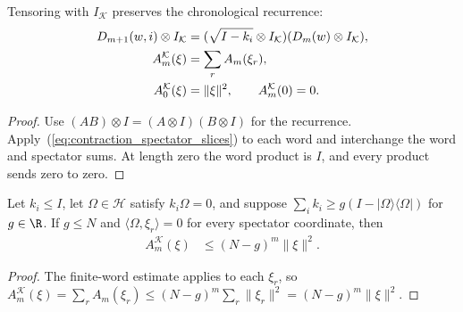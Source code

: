 \begin{theorem}
    \label{thm:contraction_spectator_sum}
    \leanok
    Tensoring with $I_{\mathcal K}$ preserves the chronological recurrence:
    \begin{align}
        D_{m+1}(w,i)\otimes I_{\mathcal K}
         & =(\sqrt{I-k_i}\otimes I_{\mathcal K})(D_m(w)\otimes I_{\mathcal K}),
        \label{eq:contraction_spectator_word_sum}\\
        A_m^{\mathcal K}(\xi)&=\sum_r A_m(\xi_r),\notag\\
        A_0^{\mathcal K}(\xi)&=\|\xi\|^2,\qquad A_m^{\mathcal K}(0)=0.\notag
    \end{align}
\end{theorem}
\begin{proof}
    \leanok
    Use $(AB)\otimes I=(A\otimes I)(B\otimes I)$ for the recurrence.
    Apply~(\ref{eq:contraction_spectator_slices}) to each word and
    interchange the word and spectator sums. At length zero the word
    product is $I$, and every product sends zero to zero.
\end{proof}

\begin{theorem}
    \label{thm:contraction_spectator_decay}
    \leanok
    Let $k_i\le I$, let $\Omega\in\mathcal H$ satisfy $k_i\Omega=0$,
    and suppose
    $\sum_i k_i\ge g(I-|\Omega\rangle\langle\Omega|)$ for $g\in\R$.
    If $g\le N$ and
    $\langle\Omega,\xi_r\rangle=0$ for every spectator coordinate, then
    \begin{align}
        A_m^{\mathcal K}(\xi)&\le(N-g)^m\|\xi\|^2.
        \label{eq:contraction_spectator_decay}
    \end{align}
\end{theorem}
\begin{proof}
    \leanok
    The finite-word estimate applies to each $\xi_r$, so
    $A_m^{\mathcal K}(\xi)=\sum_r A_m(\xi_r)
    \le(N-g)^m\sum_r\|\xi_r\|^2=(N-g)^m\|\xi\|^2$.
\end{proof}

